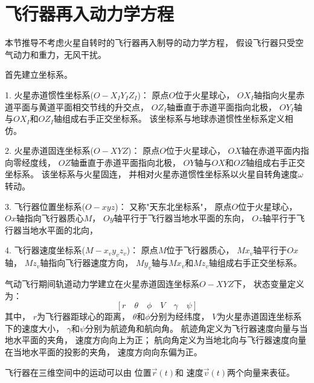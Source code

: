 \section{飞行器再入动力学方程}
本节推导不考虑火星自转时的飞行器再入制导的动力学方程，
假设飞行器只受空气动力和重力，无风干扰。

首先建立坐标系。

1. 火星赤道惯性坐标系($O-X_IY_IZ_I$)：
原点$O$位于火星球心，
$OX_I$轴指向火星赤道平面与黄道平面相交节线的升交点，
$OZ_I$轴垂直于赤道平面指向北极，
$OY_I$轴与$OX_I$和$OZ_I$轴组成右手正交坐标系。
该坐标系与地球赤道惯性坐标系定义相仿。

2. 火星赤道固连坐标系($O-XYZ$)：
原点$O$位于火星球心，
$OX$轴在赤道平面内指向零经度线，
$OZ$轴垂直于赤道平面指向北极，
$OY$轴与$OX$和$OZ$轴组成右手正交坐标系。
该坐标系与火星固连，
并相对火星赤道惯性坐标系以火星自转角速度$\omega$转动。

3. 飞行器位置坐标系($O-xyz$)：
又称"天东北坐标系"，
原点$O$位于火星球心，
$Ox$轴指向飞行器质心$M$，
$Oy$轴平行于飞行器当地水平面的东向，
$Oz$轴平行于飞行器当地水平面的北向，

4. 飞行器速度坐标系($M-x_vy_vz_v$)：
原点$M$位于飞行器质心，
$Mx_v$轴平行于$Ox$轴，
$Mz_v$轴指向飞行器速度方向，
$My_v$轴与$Mx_v$和$Mz_v$轴组成右手正交坐标系。

气动飞行期间轨道动力学建立在火星赤道固连坐标系$O-XYZ$下，
状态变量定义为：
\[[r\quad\theta\quad\phi\quad V\quad\gamma\quad\psi]\]
其中，
$r$为飞行器距球心的距离，
$\theta$和$\phi$分别为经纬度，
$V$为火星赤道固连坐标系下的速度大小，
$\gamma$和$\psi$分别为航迹角和航向角。
航迹角定义为飞行器速度向量与当地水平面的夹角，
速度方向向上为正；
航向角定义为当地北向与飞行器速度向量在当地水平面的投影的夹角，
速度方向向东偏为正。

飞行器在三维空间中的运动可以由
位置$\vec{r}(t)$和
速度$\vec{v}(t)$两个向量来表征。

